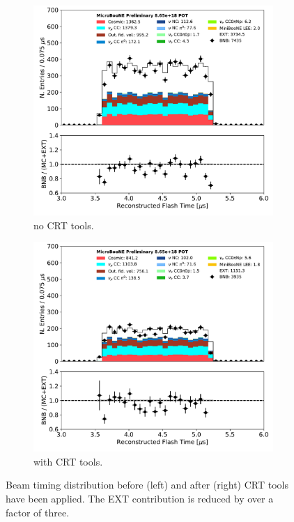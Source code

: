 \begin{figure}[ht] 
\begin{center}
    \begin{subfigure}[b]{0.45\textwidth}
    \centering
    \includegraphics[width=1.00\textwidth]{NuId-Ch2/Images/flash_time_01152020.pdf}
    \caption{\label{fig:crt:pre} no CRT tools.}
    \end{subfigure}
    \begin{subfigure}[b]{0.45\textwidth}
    \centering
    \includegraphics[width=1.00\textwidth]{NuId-Ch2/Images/flash_time_01152020_CRT.pdf}
    \caption{\label{fig:crt:post} with CRT tools.}
    \end{subfigure}
\caption{\label{fig:crt} Beam timing distribution before (left) and after (right) CRT tools have been applied. The EXT contribution is reduced by over a factor of three.}
\end{center}
\end{figure}
